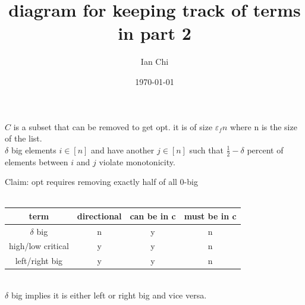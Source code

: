 \documentclass{article}
\title{diagram for keeping track of terms in part 2}
\author{Ian Chi}
\date{\today}
\begin{document}
\maketitle

\(C\) is a subset that can be removed to get opt. it is of size \(\varepsilon_f n\) where n is the size of the list.\\

\(\delta\) big elements  \(i \in [n]\) and have another \(j\in [n]\) such that \(\frac{1}{2} - \delta\) percent of elements between \(i\) and \(j\) violate monotonicity. 

Claim: opt requires removing exactly half of all 0-big\\


~\\
\quad

\begin{tabular}{ |c|c|c|c| } 
    term & directional & can be in c & must be in c\\
    \hline
    \(\delta\) big      & n & y & n\\
    high/low critical   & y & y & n\\
    left/right big      & y & y & n
\end{tabular}

~\\
\(\delta \) big implies it is either left or right big and vice versa.
\end{document}

